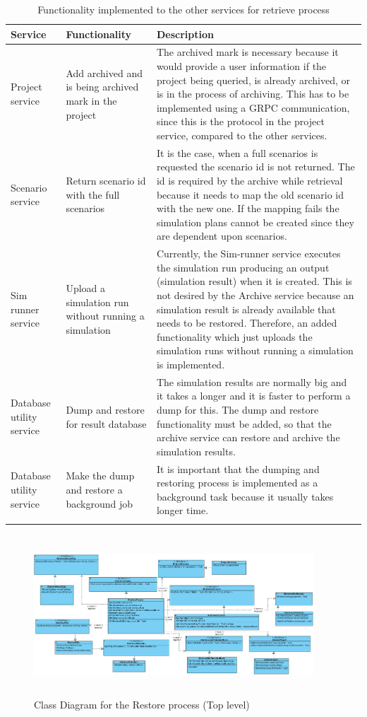     \begin{longtable}{|p{2cm}|p{6cm}|p{6cm}|}
        \hline
            \textbf{Service}  & \textbf{Functionality} & \textbf{Description}\\
        \hline
            Project service & Add archived and is being archived mark in the project &  The archived mark is necessary because
            it would provide a user information if the project being queried, is already archived, or is in the process of archiving. This has to be
            implemented using a GRPC communication, since this is the protocol in the project service, compared to the other services.  \\
        \hline
            Scenario service & Return scenario id with the full scenarios & It is the case, when a full scenarios is requested the scenario id is
            not returned. The id is required by the archive while retrieval because it needs to map the old scenario id with the new one. If the mapping
            fails the simulation plans cannot be created since they are dependent upon scenarios.\\
        \hline
            Sim runner service & Upload a simulation run without running a simulation & Currently, the Sim-runner service executes the simulation run producing an
            output (simulation result) when it is created. This is not desired by the Archive service because an simulation result is already available that needs to be restored.
            Therefore, an added 
            functionality which just uploads the simulation runs without running a simulation is implemented.\\
        \hline
            Database utility service & Dump and restore for result database & The simulation results are normally big and it takes a longer and it is faster to
            perform a dump for this. The dump and restore functionality must be added, so that the archive service can restore and archive the simulation results.\\
        \hline
            Database utility service & Make the dump and restore a background job & It is important that the dumping and restoring process is implemented as a background task
            because it usually takes longer time.\\

        \hline
        \caption{Functionality implemented to the other services for retrieve process}
        \label{table:funcRestore} 
    \end{longtable}

\begin{figure}[H]
    \centering \includegraphics[height=6cm, angle=90, origin=c, width=10.5cm]{grafiken/restoreClass.png}
    \caption{Class Diagram for the Restore process (Top level)}
    \label{fig:restoreClass}
\end{figure}
